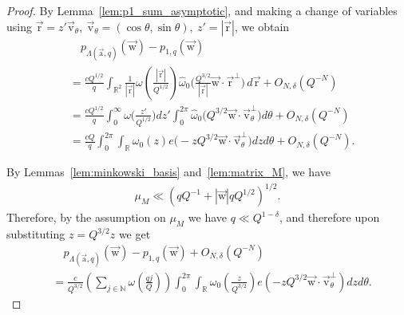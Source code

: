\documentclass[10pt,a4paper]{amsart}
\newcommand{\N}{\mathbb{N}}
\newcommand{\R}{\mathbb{R}}
\newcommand{\RR}{\mathbb{R}}
\renewcommand{\hat}{\widehat}
\newcommand{\ua}{\vec{\mathrm{a}}}
\newcommand{\ur}{\vec{\mathrm{r}}}
\newcommand{\uv}{{\vec{\mathrm{v}}}}
\newcommand{\uw}{{\vec{\mathrm{w}}}}
\newcommand{\ux}{{\vec{\mathrm{x}}}}
\begin{document}
\begin{proof}
By Lemma~\ref{lem:p1_sum_asymptotic}, and making a change of variables using \(\ur=z'\uv_{\theta}, \ \uv_{\theta}=(\cos \theta, \sin \theta),\  z'=|\ur|\), we obtain
	\begin{align*}
		&\quad p_{\Lambda(\ua, q)}(\uw)-
		p_{1,q}(\uw)\\&=\frac{cQ^{1/2}}{q}
	\int_{\R^2}\frac{1}{|\ur|}
	\omega\left(
	\frac{ |\ur| }{ Q^{1/2}}
	\right)
	\hat{\omega}_0
	\Big(
	\frac{Q^{3/2}}{|\ur|} \uw\cdot\ur^\perp
	\Big)\,d\ur
	+O_{N,\delta}(Q^{-N})\\
    &=\frac{cQ^{1/2}}{q}\int_{0}^\infty \omega\Big(\frac{z'}{Q^{1/2}}\Big) dz' \int_{0}^{2\pi}\hat{\omega}_0\Big(
     Q^{3/2}\uw \cdot \uv_{\theta}^\perp \Big)d\theta+O_{N, \delta}(Q^{-N})\\
     &=\frac{cQ}{q}\int_{0}^{2\pi}\int_{\RR}\omega_0(z)e\Big(-zQ^{3/2}\uw 
     \cdot \uv_{\theta}^\perp\Big)dz d\theta +O_{N, \delta}(Q^{-N}).
    \end{align*}

By Lemmas~\ref{lem:minkowski_basis} and~\ref{lem:matrix_M}, we have 
\begin{align}\label{muM}
\mu_M \ll (qQ^{-1}+|\uw|qQ^{1/2})^{1/2}.
\end{align} Therefore, by the assumption on \(\mu_M\) we have
	 \(q\ll Q^{1-\delta}\), and therefore upon substituting  \(z=Q^{3/2}z\) we get 
	\begin{align*}
		&\quad p_{\Lambda(\ua, q)}(\uw)-
		p_{1,q}(\uw)+O_{N,\delta}(Q^{-N})
		\\&=
		\frac{c}{Q^{3/2}}
		\left(\sum_{j\in\N} \omega\left(\frac{qj}{Q}\right)\right)
		\int_{0}^{2\pi}\int_{\RR}
		{\omega}_0\left(\frac{z}{Q^{3/2}}\right)
		e\left(-zQ^{3/2}\uw\cdot \uv_\theta^\perp\right)dzd\theta
		.
	\end{align*}
    

\end{proof}
\end{document}
